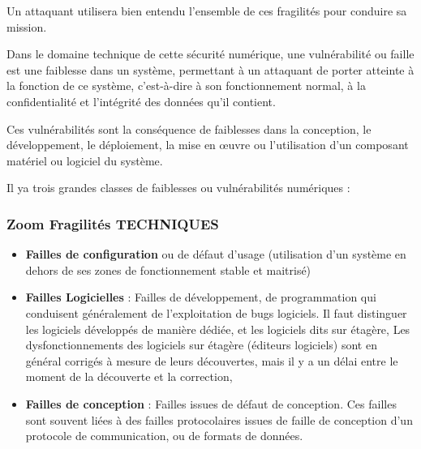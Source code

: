 Un attaquant utilisera bien entendu l’ensemble de ces fragilités pour conduire sa mission.

Dans le domaine technique de cette sécurité numérique, une vulnérabilité ou faille est une faiblesse dans un système, permettant à un attaquant de porter atteinte à la fonction de ce système, c'est-à-dire à son fonctionnement normal, à la confidentialité et l'intégrité des données qu'il contient.

Ces vulnérabilités sont la conséquence de faiblesses dans la conception, le développement, le déploiement, la mise en œuvre ou l'utilisation d'un composant matériel ou logiciel du système. 

Il ya trois grandes classes de faiblesses ou vulnérabilités numériques :

\begin{frame}
\frametitle<presentation>{Zoom Fragilités TECHNIQUES}
\begin{itemize}
\item \textbf{Failles de configuration} ou de défaut d’usage (utilisation d’un système en dehors de ses zones de fonctionnement stable et maitrisé)
\item \textbf{Failles Logicielles } : Failles de développement, de programmation qui conduisent généralement de l'exploitation de bugs logiciels. Il faut distinguer les logiciels développés de manière dédiée, et les logiciels dits sur étagère,
Les dysfonctionnements des logiciels sur étagère (éditeurs logiciels) sont en général corrigés à mesure de leurs découvertes, mais il y a un délai entre le moment de la découverte et la correction,
\item \textbf{Failles de conception} : Failles issues de défaut de conception. Ces failles sont souvent liées à des failles protocolaires issues de faille de conception d'un protocole de communication, ou de formats de données.
\end{itemize}
\end{frame}


